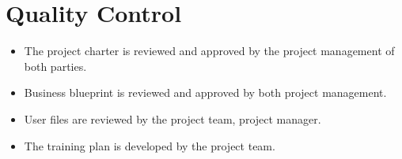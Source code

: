 \chapter{Quality Control}

\begin{itemize}
  \item The project charter is reviewed and approved by the project management of both parties.

  \item Business blueprint is reviewed and approved by both project management.

  \item User files are reviewed by the project team, project manager.

  \item The training plan is developed by the project team. 
\end{itemize}


